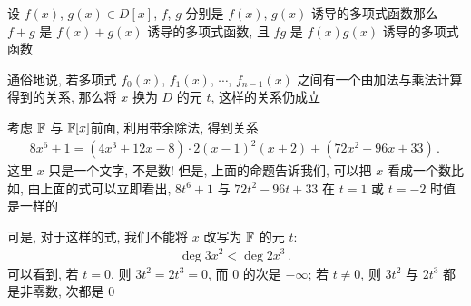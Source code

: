 \begin{proposition}
    设 $f(x)$, $g(x) \in D[x]$, $f$, $g$ 分别是 $f(x)$, $g(x)$ 诱导的多项式函数\period 那么 $f+g$ 是 $f(x)+g(x)$ 诱导的多项式函数, 且 $fg$ 是 $f(x)g(x)$ 诱导的多项式函数\period

    通俗地说, 若多项式 $f_0 (x)$, $f_1 (x)$, $\cdots$, $f_{n-1} (x)$ 之间有一个由加法与乘法计算得到的关系, 那么将 $x$ 换为 $D$ 的元 $t$, 这样的关系仍成立\period
\end{proposition}

\begin{example}
    考虑 $\mathbb{F}$ 与 $\mathbb{F}[x]$\period 前面, 利用带余除法, 得到关系
    \begin{align*}
        8x^6 + 1 = (4x^3 + 12x - 8) \cdot 2(x-1)^2 (x+2) + (72x^2 - 96x + 33) \period
    \end{align*}
    这里 $x$ 只是一个文字, 不是数! 但是, 上面的命题告诉我们, 可以把 $x$ 看成一个数\period 比如, 由上面的式可以立即看出, $8t^6 + 1$ 与 $72t^2 - 96t + 33$ 在 $t = 1$ 或 $t = -2$ 时值是一样的\period

    可是, 对于这样的式, 我们不能将 $x$ 改写为 $\mathbb{F}$ 的元 $t$:
    \begin{align*}
        \deg 3x^2 < \deg 2x^3 \period
    \end{align*}
    可以看到, 若 $t=0$, 则 $3t^2 = 2t^3 = 0$, 而 $0$ 的次是 $-\infty$; 若 $t \neq 0$, 则 $3t^2$ 与 $2t^3$ 都是非零数, 次都是 $0$\period
\end{example}

